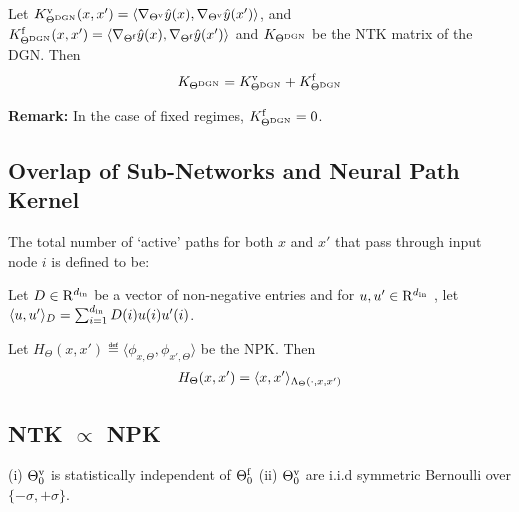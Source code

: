 \begin{proposition}\label{prop:ntks} Let $K^{\text{v}}_{\Theta^{\text{DGN}}}(x,x')=\langle  \nabla_{{\Theta}^{\text{v}}}\hat{y}(x), \nabla_{{\Theta}^{\text{v}}}\hat{y}(x')\rangle$, and  $K^{\text{f}}_{\Theta^{\text{DGN}}}(x,x')=\langle  \nabla_{\Theta^{\textrm{f}}}\hat{y}(x), \nabla_{\Theta^{\textrm{f}}}\hat{y}(x') \rangle$ and $K_{\Theta^{\text{DGN}}}$ be the NTK matrix of the DGN. Then 
\begin{align*}
K_{\Theta^{\text{DGN}}}=K^{\text{v}}_{\Theta^{\text{DGN}}}+K^{\text{f}}_{\Theta^{\text{DGN}}}
\end{align*}

\end{proposition}
\textbf{Remark:} In the case of fixed regimes, $K^{\text{f}}_{\Theta^{\text{DGN}}}=0$. 

\subsection{Overlap of Sub-Networks and Neural Path Kernel}

\begin{definition}\label{def:cnnlambda}
The total number of `active' paths for both $x$ and $x'$ that pass through input node $i$ is defined to be:\\
{}
\end{definition}
%
\begin{definition}
Let $D\in\mathrm{R}^{d_{\text{in}}}$ be a vector of non-negative entries  and for $u,u'\in\mathrm{R}^{d_{\text{in}}}$ , let $\langle u,u'\rangle_{D}=\sum_{i=1}^{d_{\text{in}}}D(i)u(i)u'(i)$. 
\end{definition}

\begin{lemma}
Let $H_{\Theta}(x,x')\eqdef\langle\phi_{x,\Theta},\phi_{x',\Theta} \rangle$ be the NPK. Then  
\begin{align*} 
H_{\Theta}(x,x')=\langle x,x'\rangle_{\Lambda_{\Theta}(\cdot,x,x')} 
\end{align*}
\end{lemma}

\subsection{NTK $\propto$ NPK}
\begin{assumption}\label{assmp:main}
(i) ${\Theta}^{\text{v}}_0$ is statistically independent of $\Theta^{\textrm{f}}_0$ (ii) ${\Theta}^{\text{v}}_0$ are i.i.d symmetric Bernoulli over $\{-{\sigma},+{\sigma}\}$. 
\end{assumption}

